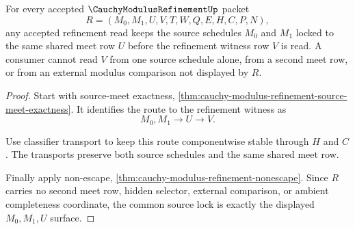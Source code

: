 \begin{theorem}
\label{thm:cauchy-modulus-refinement-common-source-lock}
For every accepted $\CauchyModulusRefinementUp$ packet
$$
R=(M_0,M_1,U,V,T,W,Q,E,H,C,P,N),
$$
any accepted refinement read keeps the source schedules $M_0$ and $M_1$ locked to the same shared meet row $U$ before the refinement witness row $V$ is read. A consumer cannot read $V$ from one source schedule alone, from a second meet row, or from an external modulus comparison not displayed by $R$.
\end{theorem}
\begin{proof}
Start with source-meet exactness, \autoref{thm:cauchy-modulus-refinement-source-meet-exactness}. It identifies the route to the refinement witness as
$$
M_0,M_1 \longrightarrow U \longrightarrow V.
$$

Use classifier transport to keep this route componentwise stable through $H$ and $C$. The transports preserve both source schedules and the same shared meet row.

Finally apply non-escape, \autoref{thm:cauchy-modulus-refinement-nonescape}. Since $R$ carries no second meet row, hidden selector, external comparison, or ambient completeness coordinate, the common source lock is exactly the displayed $M_0,M_1,U$ surface.
\end{proof}

